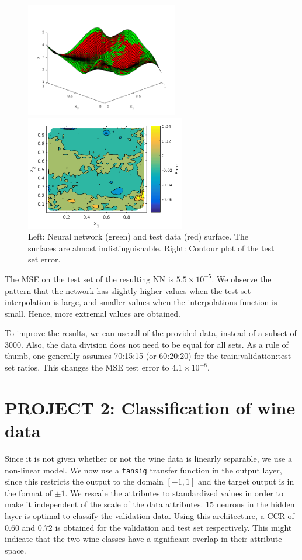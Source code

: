 \documentclass[pdftex,12pt,a4paper]{article}
\begin{document}
\begin{figure}[tbh]
\centering
\begin{minipage}{0.5\textwidth}
\includegraphics[height=5cm]{figs/NN_and_testsurf.png}
\end{minipage}%
\begin{minipage}{0.5\textwidth}
\includegraphics[height=5cm]{figs/NN_test_error.png}
\end{minipage}%
\caption{Left: Neural network (green) and test data (red) surface. The surfaces are almost indistinguishable. Right: Contour plot of the test set error. \label{fig:NN_and_testsurf}}
\end{figure}

The MSE on the test set of the resulting NN is $5.5 \times 10^{-5}$. We observe the pattern that the network has slightly higher values when the test set interpolation is large, and smaller values when the interpolations function is small. Hence, more extremal values are obtained.

To improve the results, we can use all of the provided data, instead of a subset of $3000$. Also, the data division does not need to be equal for all sets. As a rule of thumb, one generally assumes 70:15:15 (or 60:20:20) for the train:validation:test set ratios. This changes the MSE test error to $4.1\times10^{-8}$.

\section{PROJECT 2: Classification of wine data}\label{sec:classification}
Since it is not given whether or not the wine data is linearly separable, we use a non-linear model. We now use a \texttt{tansig} transfer function in the output layer, since this restricts the output to the domain $[-1,1]$ and the target output is in the format of $\pm 1$. We rescale the attributes to standardized values in order to make it independent of the scale of the data attributes. $15$ neurons in the hidden layer is optimal to classify the validation data. Using this architecture, a CCR of $0.60$  and $0.72$ is obtained for the validation and test set respectively. This might indicate that the two wine classes have a significant overlap in their attribute space.
\end{document}

